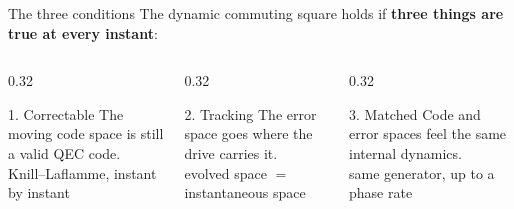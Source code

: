 \begin{frame}{The three conditions}
  The dynamic commuting square holds if \textbf{three things are true at every instant}:

  \vfill
  \begin{columns}[T]
    \begin{column}{0.32\textwidth}
      \begin{block}{1. Correctable}
        \centering
        The moving code space is still a valid QEC code.
        \\[0.4em]
        {\color{tagmid}\scriptsize Knill--Laflamme, instant by instant}
      \end{block}
    \end{column}
    \begin{column}{0.32\textwidth}
      \begin{block}{2. Tracking}
        \centering
        The error space goes where the drive carries it.
        \\[0.4em]
        {\color{tagmid}\scriptsize evolved space $=$ instantaneous space}
      \end{block}
    \end{column}
    \begin{column}{0.32\textwidth}
      \begin{block}{3. Matched}
        \centering
        Code and error spaces feel the same internal dynamics.
        \\[0.4em]
        {\color{tagmid}\scriptsize same generator, up to a phase rate}
      \end{block}
    \end{column}
  \end{columns}
  \vfill


\end{frame}
